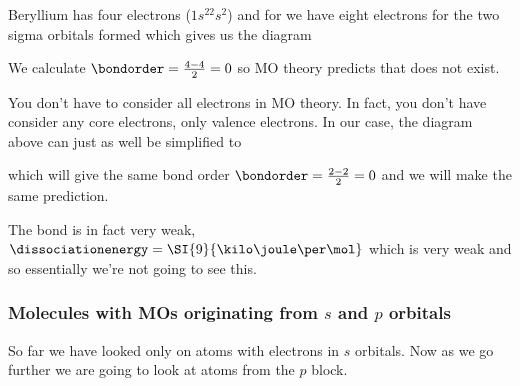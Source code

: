\documentclass[../mit-general-chemistry.tex]{subfiles}
\begin{document}
Beryllium has four electrons ($1s^22s^2$) and for  we have
eight electrons for the two sigma orbitals formed which gives us the
diagram


\begin{center}
  \begin{MOdiagram}[names,labels,labels-fs=\footnotesize]
    \EnergyAxis[title=$E$]
  \end{MOdiagram}
\end{center}

We calculate $\bondorder = \frac{4 - 4}{2} = 0$ so MO theory predicts
that  does not exist.



You don't have to consider all electrons in MO theory. In fact, you
don't have consider any core electrons, only valence electrons. In our
case, the diagram above can just as well be simplified to

\begin{center}
  \begin{MOdiagram}[names,labels,labels-fs=\footnotesize]
    \EnergyAxis[title=$E$]
  \end{MOdiagram}
\end{center}

which will give the same bond order $\bondorder = \frac{2 - 2}{2} = 0$
and we will make the same prediction.

The  bond is in fact very weak, $\dissociationenergy
= \SI{9}{\kilo\joule\per\mol}$ which is very weak and so essentially
we're not going to see this.










\subsubsection{Molecules with MOs originating from $s$ and $p$ orbitals}


So far we have looked only on atoms with electrons in $s$
orbitals. Now as we go further we are going to look at atoms from the
$p$ block.
\end{document}
